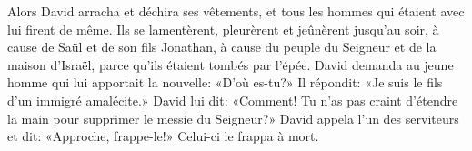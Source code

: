 Alors David arracha et déchira ses vêtements,
	et tous les hommes qui étaient avec lui firent de même.
Ils se lamentèrent, pleurèrent et jeûnèrent jusqu’au soir,
	à cause de Saül et de son fils Jonathan,
	à cause du peuple du Seigneur et de la maison d’Israël,
	parce qu’ils étaient tombés par l’épée.
David demanda au jeune homme qui lui apportait la nouvelle:
	«D’où es-tu?»
	Il répondit: «Je suis le fils d’un immigré amalécite.»
David lui dit:
	«Comment! Tu n’as pas craint d’étendre la main pour supprimer le messie du Seigneur?»
David appela l’un des serviteurs et dit: «Approche, frappe-le!»
	Celui-ci le frappa à mort.
